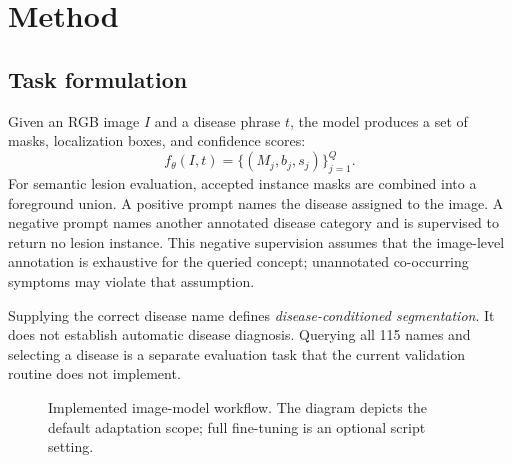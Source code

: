 \section{Method}
\subsection{Task formulation}
Given an RGB image $I$ and a disease phrase $t$, the model produces a set of masks, localization boxes, and confidence scores:
\begin{equation}
 f_\theta(I,t)=\{(M_j,b_j,s_j)\}_{j=1}^{Q}.
\end{equation}
For semantic lesion evaluation, accepted instance masks are combined into a foreground union. A positive prompt names the disease assigned to the image. A negative prompt names another annotated disease category and is supervised to return no lesion instance. This negative supervision assumes that the image-level annotation is exhaustive for the queried concept; unannotated co-occurring symptoms may violate that assumption.

Supplying the correct disease name defines \emph{disease-conditioned segmentation}. It does not establish automatic disease diagnosis. Querying all 115 names and selecting a disease is a separate evaluation task that the current validation routine does not implement.

\begin{figure}[t]
\centering
{}
\caption{Implemented image-model workflow. The diagram depicts the default adaptation scope; full fine-tuning is an optional script setting.}
\label{fig:pipeline}
\end{figure}

